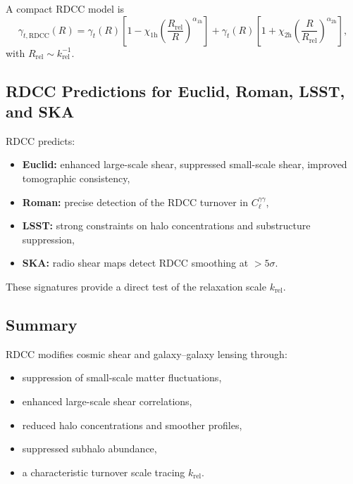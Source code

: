 \documentclass[11pt,a4paper]{article}
\begin{document}
A compact RDCC model is
\begin{equation}
\gamma_{t,\mathrm{RDCC}}(R)
=
\gamma_{t}(R)
\left[
1
-
\chi_{1\mathrm{h}}
\left(
\frac{R_{\mathrm{rel}}}{R}
\right)^{\alpha_{1\mathrm{h}}}
\right]
+
\gamma_{t}(R)
\left[
1
+
\chi_{2\mathrm{h}}
\left(
\frac{R}{R_{\mathrm{rel}}}
\right)^{\alpha_{2\mathrm{h}}}
\right],
\end{equation}
with $R_{\mathrm{rel}} \sim k_{\mathrm{rel}}^{-1}$.

\subsection{RDCC Predictions for Euclid, Roman, LSST, and SKA}

RDCC predicts:
\begin{itemize}
\item \textbf{Euclid:} enhanced large-scale shear, suppressed small-scale shear, improved tomographic consistency,
\item \textbf{Roman:} precise detection of the RDCC turnover in $C_{\ell}^{\gamma\gamma}$,
\item \textbf{LSST:} strong constraints on halo concentrations and substructure suppression,
\item \textbf{SKA:} radio shear maps detect RDCC smoothing at $>5\sigma$.
\end{itemize}

These signatures provide a direct test of the relaxation scale $k_{\mathrm{rel}}$.

\subsection{Summary}

RDCC modifies cosmic shear and galaxy–galaxy lensing through:
\begin{itemize}
\item suppression of small-scale matter fluctuations,
\item enhanced large-scale shear correlations,
\item reduced halo concentrations and smoother profiles,
\item suppressed subhalo abundance,
\item a characteristic turnover scale tracing $k_{\mathrm{rel}}$.
\end{itemize}

\end{document}
